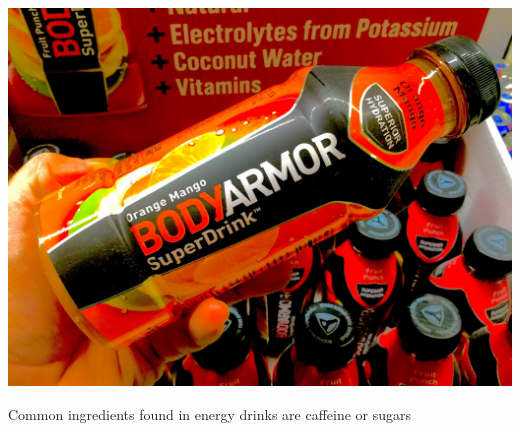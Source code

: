 \documentclass[main.tex]{subfiles}
\begin{document}
\begin{marginfigure}%
\includegraphics{chapter9/figure5}
\caption{Common ingredients found in energy drinks are caffeine or sugars}
\end{marginfigure}%
\end{document}
